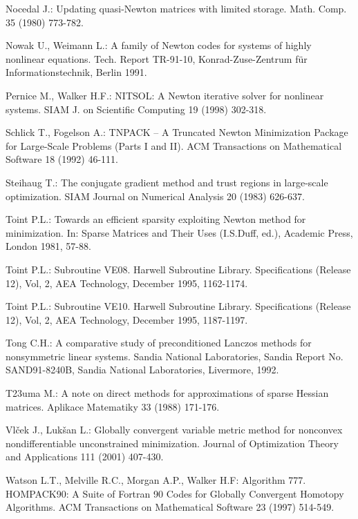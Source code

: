 \documentclass{esub2acm}
\begin{document}
\begin{thebibliography}{99}
Nocedal J.: Updating quasi-Newton matrices with limited storage.
Math. Comp. 35 (1980) 773-782.

Nowak U., Weimann L.: A family of Newton codes for systems of
highly nonlinear equations. Tech. Report TR-91-10, Konrad-Zuse-Zentrum
f\"{u}r Informationstechnik, Berlin 1991.

Pernice M., Walker H.F.: NITSOL: A Newton iterative solver for
nonlinear systems. SIAM J. on Scientific Computing 19 (1998) 302-318.


Schlick T., Fogelson A.: TNPACK -- A Truncated Newton Minimization
Package for Large-Scale Problems (Parts I and II). ACM Transactions
on Mathematical Software 18 (1992) 46-111.

Steihaug T.: The conjugate gradient method and trust regions in
large-scale optimization. SIAM Journal on Numerical Analysis 20
(1983) 626-637.

Toint P.L.: Towards an efficient sparsity exploiting Newton method
for minimization. In: Sparse Matrices and Their Uses (I.S.Duff, ed.),
Academic Press, London 1981, 57-88.

Toint P.L.: Subroutine VE08. Harwell Subroutine Library. Specifications
(Release 12), Vol, 2, AEA Technology, December 1995, 1162-1174.

Toint P.L.: Subroutine VE10. Harwell Subroutine Library. Specifications
(Release 12), Vol, 2, AEA Technology, December 1995, 1187-1197.

Tong C.H.: A comparative study of preconditioned Lanczos methods for
nonsymmetric linear systems. Sandia National Laboratories, Sandia
Report No. SAND91-8240B, Sandia National Laboratories, Livermore, 1992.

T\accent23uma M.: A note on direct methods for approximations of sparse
Hessian matrices. Aplikace Matematiky 33 (1988) 171-176.

Vl\v{c}ek J., Luk\v{s}an L.: Globally convergent variable metric
method for nonconvex nondifferentiable unconstrained minimization.
Journal of Optimization Theory and Applications 111 (2001) 407-430.

Watson L.T., Melville R.C., Morgan A.P., Walker H.F: Algorithm 777.
HOMPACK90: A Suite of Fortran 90 Codes for Globally Convergent Homotopy
Algorithms. ACM Transactions on Mathematical Software 23 (1997) 514-549.

\end{thebibliography}
\end{document}
